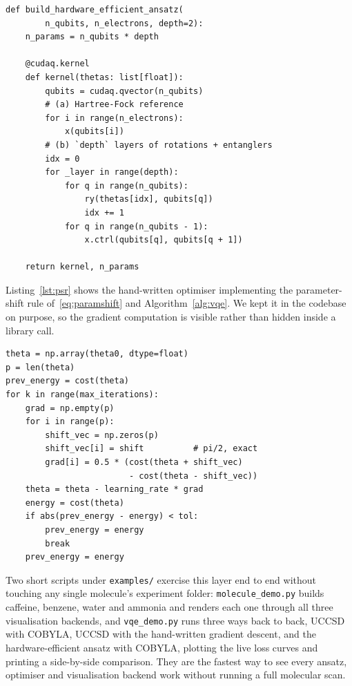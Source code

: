 \documentclass[sigconf,screen,nonacm]{acmart}
\begin{document}
\begin{lstlisting}[caption={Hardware-efficient ansatz. The parameter count is
exactly \texttt{n\_qubits * depth}; increasing \texttt{depth} enlarges the
trial-state family at the cost of a harder optimisation, the same
flexibility-versus-conditioning trade-off as raising a polynomial degree.},
label={lst:hea}]
def build_hardware_efficient_ansatz(
        n_qubits, n_electrons, depth=2):
    n_params = n_qubits * depth

    @cudaq.kernel
    def kernel(thetas: list[float]):
        qubits = cudaq.qvector(n_qubits)
        # (a) Hartree-Fock reference
        for i in range(n_electrons):
            x(qubits[i])
        # (b) `depth` layers of rotations + entanglers
        idx = 0
        for _layer in range(depth):
            for q in range(n_qubits):
                ry(thetas[idx], qubits[q])
                idx += 1
            for q in range(n_qubits - 1):
                x.ctrl(qubits[q], qubits[q + 1])

    return kernel, n_params
\end{lstlisting}

Listing~\ref{lst:psr} shows the hand-written optimiser implementing the
parameter-shift rule of~\eqref{eq:paramshift} and Algorithm~\ref{alg:vqe}. We
kept it in the codebase on purpose, so the gradient computation is visible
rather than hidden inside a library call.

\begin{lstlisting}[caption={Gradient descent with parameter-shift gradients.
The inner loop costs $2p$ energy evaluations per gradient, which is why
COBYLA is the practical default for production scans.},
label={lst:psr}]
theta = np.array(theta0, dtype=float)
p = len(theta)
prev_energy = cost(theta)
for k in range(max_iterations):
    grad = np.empty(p)
    for i in range(p):
        shift_vec = np.zeros(p)
        shift_vec[i] = shift          # pi/2, exact
        grad[i] = 0.5 * (cost(theta + shift_vec)
                         - cost(theta - shift_vec))
    theta = theta - learning_rate * grad
    energy = cost(theta)
    if abs(prev_energy - energy) < tol:
        prev_energy = energy
        break
    prev_energy = energy
\end{lstlisting}

Two short scripts under \texttt{examples/} exercise this layer end to end
without touching any single molecule's experiment folder:
\texttt{molecule\_demo.py} builds caffeine, benzene, water and ammonia and
renders each one through all three visualisation backends, and
\texttt{vqe\_demo.py} runs  three ways back to back, UCCSD with
COBYLA, UCCSD with the hand-written gradient descent, and the
hardware-efficient ansatz with COBYLA, plotting the live loss curves and
printing a side-by-side comparison. They are the fastest way to see every
ansatz, optimiser and visualisation backend work without running a full
molecular scan.
\end{document}
